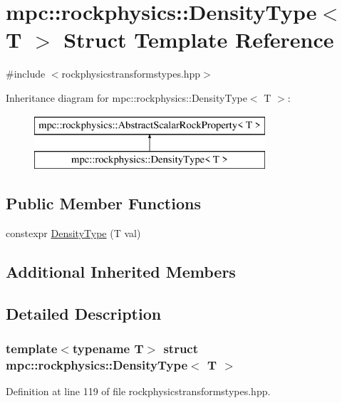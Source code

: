 \hypertarget{structmpc_1_1rockphysics_1_1_density_type}{}\section{mpc\+:\+:rockphysics\+:\+:Density\+Type$<$ T $>$ Struct Template Reference}
\label{structmpc_1_1rockphysics_1_1_density_type}


{\ttfamily \#include $<$rockphysicstransformstypes.\+hpp$>$}

Inheritance diagram for mpc\+:\+:rockphysics\+:\+:Density\+Type$<$ T $>$\+:\begin{figure}[H]
\begin{center}
\leavevmode
\includegraphics[height=2.000000cm]{structmpc_1_1rockphysics_1_1_density_type}
\end{center}
\end{figure}
\subsection*{Public Member Functions}
\begin{DoxyCompactItemize}
\item 
constexpr \mbox{\hyperlink{structmpc_1_1rockphysics_1_1_density_type_a2d38b577150e0f26513dbf9927d6034d}{Density\+Type}} (T val)
\end{DoxyCompactItemize}
\subsection*{Additional Inherited Members}


\subsection{Detailed Description}
\subsubsection*{template$<$typename T$>$\newline
struct mpc\+::rockphysics\+::\+Density\+Type$<$ T $>$}



Definition at line 119 of file rockphysicstransformstypes.\+hpp.



